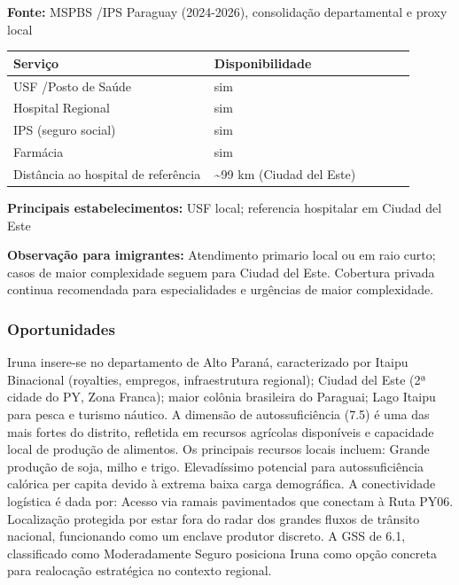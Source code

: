 \textbf{Fonte:} MSPBS /\allowbreak  IPS Paraguay (2024-2026), consolidação
departamental e proxy local

{\def\LTcaptype{none} %
\begin{longtable}{@{}>{\raggedright\arraybackslash}p{0.45\linewidth} >{\raggedright\arraybackslash}p{0.45\linewidth}@{}}
\toprule\noalign{}
Serviço & Disponibilidade \\
\midrule\noalign{}
\endhead
\bottomrule\noalign{}
\endlastfoot
USF /\allowbreak  Posto de Saúde & sim \\
Hospital Regional & sim \\
IPS (seguro social) & sim \\
Farmácia & sim \\
Distância ao hospital de referência & \textasciitilde99 km (Ciudad del
Este) \\
\end{longtable}
}

\textbf{Principais estabelecimentos:} USF local; referencia hospitalar
em Ciudad del Este

\textbf{Observação para imigrantes:} Atendimento primario local ou em
raio curto; casos de maior complexidade seguem para Ciudad del Este.
Cobertura privada continua recomendada para especialidades e urgências
de maior complexidade.
\newpage

\subsubsection*{Oportunidades}\label{oport-iruna-1019}
Iruna insere-se no departamento de Alto Paraná, caracterizado por Itaipu Binacional (royalties, empregos, infraestrutura regional); Ciudad del Este (2ª cidade do PY, Zona Franca); maior colônia brasileira do Paraguai; Lago Itaipu para pesca e turismo náutico. A dimensão de autossuficiência (7.5) é uma das mais fortes do distrito, refletida em recursos agrícolas disponíveis e capacidade local de produção de alimentos. Os principais recursos locais incluem: Grande produção de soja, milho e trigo. Elevadíssimo potencial para autossuficiência calórica per capita devido à extrema baixa carga demográfica. A conectividade logística é dada por: Acesso via ramais pavimentados que conectam à Ruta PY06. Localização protegida por estar fora do radar dos grandes fluxos de trânsito nacional, funcionando como um enclave produtor discreto. A GSS de 6.1, classificado como Moderadamente Seguro posiciona Iruna como opção concreta para realocação estratégica no contexto regional.


